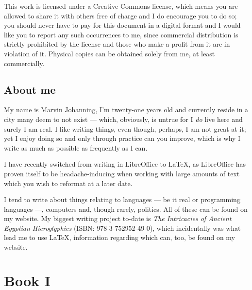 \documentclass[a5paper,twoside,12pt]{report}
\begin{document}
This work is licensed under a Creative Commons license, which means you are allowed to share it with others free of charge and I do encourage you to do so; you should never have to pay for this document in a digital format and I would like you to report any such occurrences to me, since commercial distribution is strictly prohibited by the license and those who make a profit from it are in violation of it. Physical copies can be obtained solely from me, at least commercially. 


\newpage

\chapter*{About me}

  My name is Marvin Johanning, I'm twenty-one years old and currently reside in a city many deem to not exist — which, obviously, is untrue for I \textit{do} live here and surely I am real. I like writing things, even though, perhaps, I am not great at it; yet I enjoy doing so and only through practice can you improve, which is why I write as much as possible as frequently as I can.

  I have recently switched from writing in LibreOffice to \LaTeX, as LibreOffice has proven itself to be headache-inducing when working with large amounts of text which you wish to reformat at a later date. 

  I tend to write about things relating to languages — be it real or programming languages —, computers and, though rarely, politics. All of these can be found on my website. My biggest writing project to-date is \textit{The Intricacies of Ancient Egyptian Hieroglyphics} (ISBN: 978-3-752952-49-0), which incidentally was what lead me to use \LaTeX, information regarding which can, too, be found on my website.
  \newpage


\thispagestyle{empty}
  \mbox{}
  \newpage

\part*{Book I}
  \newpage

\thispagestyle{empty}
  \mbox{}
  \newpage
\end{document}
